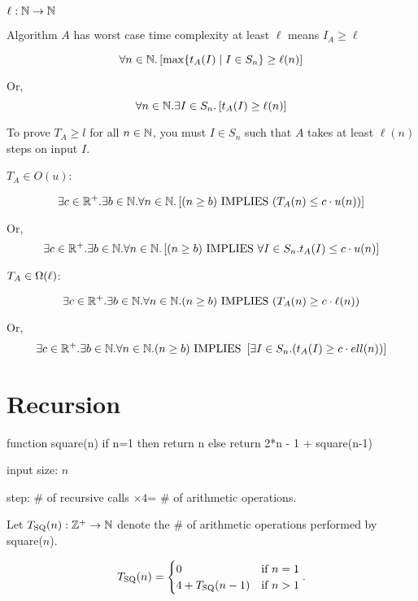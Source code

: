 \documentclass[11pt, cyan, night, 0.5in]{hw}
\begin{document}
$\ell:\mathbb{N}\to\mathbb{N}$

Algorithm $A$ has worst case time complexity at least $\ell$ means $I_A\geq \ell$

\[\forall n\in\mathbb{N}.\left[\max\{t_A(I)\mid I\in S_n\}\geq \ell(n)\right]\]

Or, \[\forall n\in\mathbb{N}. \mathbf{\exists} I\in S_n. \left[t_A(I)\geq \ell(n)\right]\]


To prove $T_A\geq l$ for all $n\in\mathbb{N}$, you must  $I\in S_n$ such that $A$ takes at least $\ell(n)$ steps on input $I$. 

\np

$T_A\in O(u)$:

\[\exists c\in\mathbb{R}^+. \exists b\in\mathbb{N}.\forall n\in\mathbb{N}. \left[(n\geq b)\,\,\mathrm{IMPLIES}\,\, (T_A(n)\leq c\cdot u(n))\right]\]

Or, \[\exists c\in\mathbb{R}^+.\exists b\in\mathbb{N}.\forall n\in\mathbb{N}.\left[(n\geq b)\,\,\mathrm{IMPLIES}\,\, \forall I\in S_n. t_A(I)\leq c\cdot u(n)\right]\]

$T_A\in\Omega(\ell)$:

\[\exists c\in\mathbb{R}^+.\exists b\in\mathbb{N}.\forall n\in\mathbb{N}. (n\geq b)\,\,\mathrm{IMPLIES}\,\, (T_A(n)\geq c\cdot \ell(n))\]

Or, \[\exists c\in\mathbb{R}^+. \exists b\in\mathbb{N}. \forall n\in\mathbb{N}. (n\geq b)\,\,\mathrm{IMPLIES}\,\, \left[\exists I\in S_n. (t_A(I)\geq c\cdot ell(n))\right]\]

\np

\section{Recursion}

\begin{code}
function square(n)
if n=1
then return n
else return 2*n - 1 + square(n-1)
\end{code}

input size: $n$

step: \# of recursive calls $\times4$= \# of arithmetic operations.

Let $T_{\text{SQ}}(n):\mathbb{Z}^+\to\mathbb{N}$ denote the \# of arithmetic operations performed by square($n$).

\[T_{\text{SQ}}(n)=\begin{cases}
    0 & \text{if } n=1\\
    4+T_{\text{SQ}}(n-1) & \text{if } n>1
\end{cases}.\]
\end{document}
